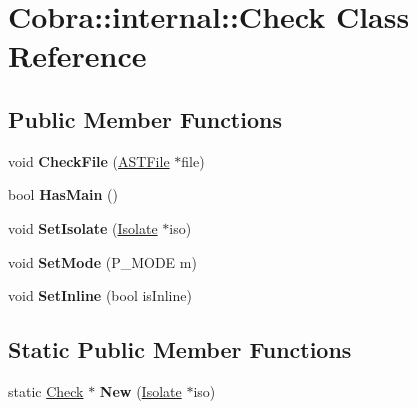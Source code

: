 \hypertarget{class_cobra_1_1internal_1_1_check}{\section{Cobra\+:\+:internal\+:\+:Check Class Reference}
\label{class_cobra_1_1internal_1_1_check}
}
\subsection*{Public Member Functions}
\begin{DoxyCompactItemize}
\item 
\hypertarget{class_cobra_1_1internal_1_1_check_aceadf25dcbd139918ddcc751dddadaed}{void {\bfseries Check\+File} (\hyperlink{class_cobra_1_1internal_1_1_a_s_t_file}{A\+S\+T\+File} $\ast$file)}\label{class_cobra_1_1internal_1_1_check_aceadf25dcbd139918ddcc751dddadaed}

\item 
\hypertarget{class_cobra_1_1internal_1_1_check_a0221d7a96e1581a4e9c9f097c0cb75b7}{bool {\bfseries Has\+Main} ()}\label{class_cobra_1_1internal_1_1_check_a0221d7a96e1581a4e9c9f097c0cb75b7}

\item 
\hypertarget{class_cobra_1_1internal_1_1_check_afb99bd541cf71b4abc5ccfc7a583a7c2}{void {\bfseries Set\+Isolate} (\hyperlink{class_cobra_1_1internal_1_1_isolate}{Isolate} $\ast$iso)}\label{class_cobra_1_1internal_1_1_check_afb99bd541cf71b4abc5ccfc7a583a7c2}

\item 
\hypertarget{class_cobra_1_1internal_1_1_check_a0a5616a69b751872832d579c6c8c876c}{void {\bfseries Set\+Mode} (P\+\_\+\+M\+O\+D\+E m)}\label{class_cobra_1_1internal_1_1_check_a0a5616a69b751872832d579c6c8c876c}

\item 
\hypertarget{class_cobra_1_1internal_1_1_check_a09a29258b5b9cb5c67e7c108641f7cec}{void {\bfseries Set\+Inline} (bool is\+Inline)}\label{class_cobra_1_1internal_1_1_check_a09a29258b5b9cb5c67e7c108641f7cec}

\end{DoxyCompactItemize}
\subsection*{Static Public Member Functions}
\begin{DoxyCompactItemize}
\item 
\hypertarget{class_cobra_1_1internal_1_1_check_a7d4a05b61c62752aa51e4a6c345bf46f}{static \hyperlink{class_cobra_1_1internal_1_1_check}{Check} $\ast$ {\bfseries New} (\hyperlink{class_cobra_1_1internal_1_1_isolate}{Isolate} $\ast$iso)}\label{class_cobra_1_1internal_1_1_check_a7d4a05b61c62752aa51e4a6c345bf46f}

\end{DoxyCompactItemize}
